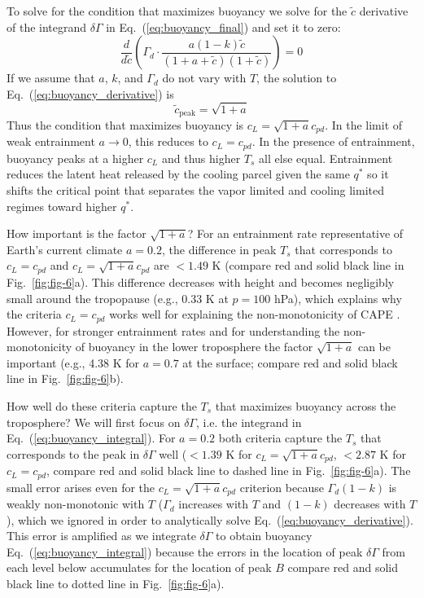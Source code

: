 \documentclass[draft]{ametsocV6.1}
\begin{document}
To solve for the condition that maximizes buoyancy we solve for the $\tilde{c}$ derivative of the integrand $\delta \Gamma$ in Eq.~(\ref{eq:buoyancy_final}) and set it to zero:
\begin{equation}
    \frac{d}{d \tilde{c}}\left(\Gamma_d \cdot \frac{a(1-k)\tilde{c}}{(1+a+\tilde{c})(1+\tilde{c})}\right) = 0 \label{eq:buoyancy_derivative}
\end{equation}
If we assume that $a$, $k$, and $\Gamma_d$ do not vary with $T$, the solution to Eq.~(\ref{eq:buoyancy_derivative}) is
\begin{equation}
    \tilde{c}_\text{peak}=\sqrt{1+a} \label{eq:buoyancy_quadratic}
\end{equation}
Thus the condition that maximizes buoyancy is $c_L = \sqrt{1+a} c_{pd}$. In the limit of weak entrainment $a \to 0$, this reduces to $c_L = c_{pd}$. In the presence of entrainment, buoyancy peaks at a higher $c_L$ and thus higher $T_s$ all else equal. Entrainment reduces the latent heat released by the cooling parcel given the same $q^*$ so it shifts the critical point that separates the vapor limited and cooling limited regimes toward higher $q^*$.

How important is the factor $\sqrt{1+a}$? For an entrainment rate representative of Earth's current climate $a=0.2$, the difference in peak $T_s$ that corresponds to $c_L=c_{pd}$ and $c_L=\sqrt{1+a}c_{pd}$ are $< 1.49$ K (compare red and solid black line in Fig.~\ref{fig:fig-6}a). This difference decreases with height and becomes negligibly small around the tropopause (e.g., 0.33 K at $p=100$ hPa), which explains why the criteria $c_L = c_{pd}$ works well for explaining the non-monotonicity of CAPE \citep{romps2016}. However, for stronger entrainment rates and for understanding the non-monotonicity of buoyancy in the lower troposphere the factor $\sqrt{1+a}$ can be important (e.g., 4.38 K for $a=0.7$ at the surface; compare red and solid black line in Fig.~\ref{fig:fig-6}b).


How well do these criteria capture the $T_s$ that maximizes buoyancy across the troposphere? We will first focus on $\delta \Gamma$, i.e. the integrand in Eq.~(\ref{eq:buoyancy_integral}). For $a=0.2$ both criteria capture the $T_s$ that corresponds to the peak in $\delta \Gamma$ well ($<1.39$ K for $c_L=\sqrt{1+a}c_{pd}$, $< 2.87$ K for $c_L=c_{pd}$, compare red and solid black line to dashed line in Fig.~\ref{fig:fig-6}a). The small error arises even for the $c_L=\sqrt{1+a}c_{pd}$ criterion because $\Gamma_d(1-k)$ is weakly non-monotonic with $T$ ($\Gamma_d$ increases with $T$ and $(1-k)$ decreases with $T$), which we ignored in order to analytically solve Eq.~(\ref{eq:buoyancy_derivative}). This error is amplified as we integrate $\delta \Gamma$ to obtain buoyancy Eq.~(\ref{eq:buoyancy_integral}) because the errors in the location of peak $\delta \Gamma$ from each level below accumulates for the location of peak $B$ compare red and solid black line to dotted line in Fig.~\ref{fig:fig-6}a).
\end{document}
